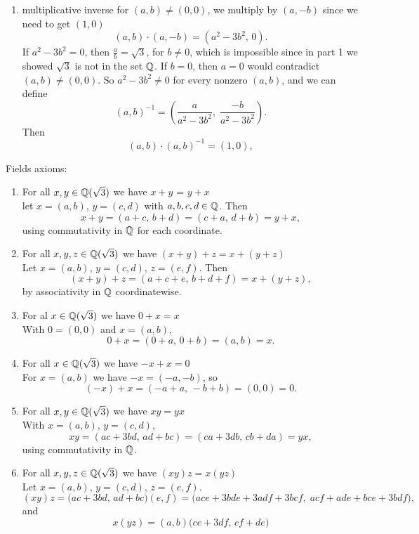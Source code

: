 \documentclass{report}
\begin{document}
\begin{proofWithHibiscus}
\begin{enumerate}
\begin{enumerate}
      \item multiplicative inverse for $(a,b)\neq(0,0)$, we multiply by $(a,-b)$ since we need to get $(1,0)$
      \[
      (a,b)\cdot(a,-b)=(a^2-3b^2,\,0).
      \]
      If $a^2-3b^2=0$, then $\frac{a}{b}=\sqrt{3}$, for $b\neq0$, which is impossible since in part 1 we showed $\sqrt{3}$ is not in the set $\mathbb{Q}$. If $b=0$, then $a=0$ would contradict $(a,b)\neq(0,0)$. So $a^2-3b^2\neq0$ for every nonzero $(a,b)$, and we can define
      \[
      (a,b)^{-1}=\left(\frac{a}{a^2-3b^2},\; \frac{-b}{a^2-3b^2}\right).
      \]
      Then
      \[
      (a,b)\cdot(a,b)^{-1}=(1,0),
      \]
    \end{enumerate}
    Fields axioms: 
    \begin{enumerate}
      \item For all $x,y \in \mathbb{Q}(\sqrt{3})$ we have $x + y$ = $y + x$ \\
        let $x=(a,b)$, $y=(c,d)$ with $a,b,c,d\in\mathbb{Q}$. Then
        \[
          x+y=(a+c,\,b+d)=(c+a,\,d+b)=y+x,
        \]
        using commutativity in $\mathbb{Q}$ for each coordinate.
      \item For all $x,y,z \in \mathbb{Q}(\sqrt{3})$ we have $(x+y) + z = x + (y + z)$ \\
        Let $x=(a,b)$, $y=(c,d)$, $z=(e,f)$. Then
        \[
          (x+y)+z=(a+c+e,\,b+d+f)=x+(y+z),
        \]
        by associativity in $\mathbb{Q}$ coordinatewise.
      \item For al $x \in \mathbb{Q}(\sqrt{3})$ we have $0 + x = x$ \\
        With $0=(0,0)$ and $x=(a,b)$,
        \[
          0+x=(0+a,\,0+b)=(a,b)=x.
        \]
      \item For all $x \in \mathbb{Q}(\sqrt{3})$ we have $ - x + x = 0$\\
        For $x=(a,b)$ we have $-x=(-a,-b)$, so
        \[
        (-x)+x=(-a+a,\,-b+b)=(0,0)=0.
        \]
      \item For all $x,y \in \mathbb{Q}(\sqrt{3})$ we have $xy = yx$ \\
        With $x=(a,b)$, $y=(c,d)$,
        \[
          xy=(ac+3bd,\,ad+bc)=(ca+3db,\,cb+da)=yx,
        \]
        using commutativity in $\mathbb{Q}$.
      \item For all $x,y,z\in \mathbb{Q}(\sqrt{3})$ we have $(xy)z = x(yz)$ \\
        Let $x=(a,b)$, $y=(c,d)$, $z=(e,f)$. 
        \[
          (xy)z=\big(ac+3bd,\,ad+bc\big)(e,f)
              =\big(ace+3bde+3adf+3bcf,\; acf+ade+bce+3bdf\big),
        \]
        and
        \[
          x(yz)=(a,b)\big(ce+3df,\,cf+de\big)
\]
\end{enumerate}
\end{enumerate}
\end{proofWithHibiscus}
\end{document}
